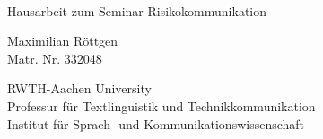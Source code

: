 \documentclass[fontsize=13pt,a4paper]{article}
\begin{document}
\thispagestyle{empty}

{%
\sffamily
\centering
\Large

~\vspace{\fill}

{\huge
Hausarbeit zum Seminar Risikokommunikation}

\vspace{2.5cm}

{\large
Maximilian Röttgen
}\\
Matr. Nr. 332048

\vspace{3.5cm}

RWTH-Aachen University\\
Professur für Textlinguistik und Technikkommunikation\\
Institut für Sprach- und Kommunikationswissenschaft

\vspace{3.5cm}

\vspace{\fill}


}%
\clearpage
\sffamily

\tableofcontents
\end{document}
